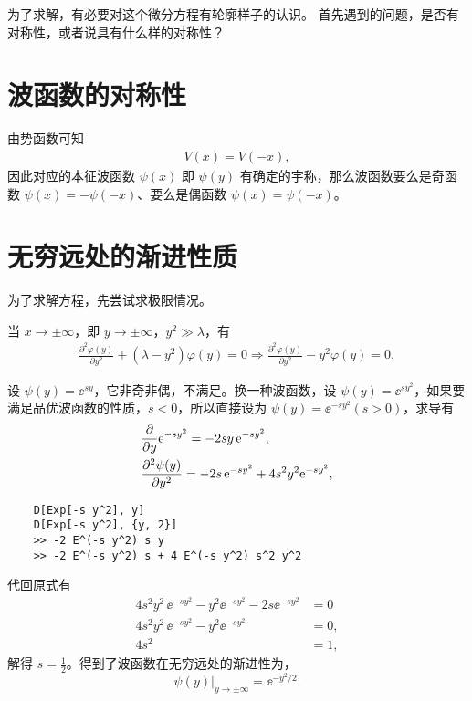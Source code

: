 为了求解，有必要对这个微分方程有轮廓样子的认识。
首先遇到的问题，是否有对称性，或者说具有什么样的对称性？
\section{波函数的对称性}
由势函数可知
\begin{align}
    V(x) = V(-x),
\end{align}
因此对应的本征波函数 $\psi(x)$ 即 $\psi(y)$ 有确定的宇称，那么波函数要么是奇函数 $\psi(x) = -\psi(-x)$、要么是偶函数 $\psi(x) = \psi(-x)$。

\section{无穷远处的渐进性质}
为了求解方程，先尝试求极限情况。

当 $x \rightarrow \pm \infty$，即 $y \rightarrow \pm \infty$，$y^2 \gg \lambda$，有
\begin{align}
    \frac{\partial^2 \varphi(y)}{\partial y^2}+\left(\lambda-y^2\right) \varphi(y)=0 \Rightarrow \frac{\partial^2 \varphi(y)}{\partial y^2}-y^2 \varphi(y)=0,
\end{align}

设 $\psi(y) = \ee^{sy}$，它非奇非偶，不满足。换一种波函数，设 $\psi(y) = \ee^{sy^2}$，如果要满足品优波函数的性质，$s<0$，所以直接设为 $\psi(y) = \ee^{-sy^2} (s>0)$，求导有
\begin{align}
    &\frac{\partial}{\partial y} \mathrm{e}^{-sy^2} = -2sy \, \mathrm{e}^{-sy^2}, \\
    &\pdv[2]{\psi(y)}{y} = -2 s\, \mathrm{e}^{-s y^2} + 4 s^2 y^2 \mathrm{e}^{-s y^2},
\end{align}
\begin{lstlisting}
    D[Exp[-s y^2], y]
    D[Exp[-s y^2], {y, 2}]
    >> -2 E^(-s y^2) s y
    >> -2 E^(-s y^2) s + 4 E^(-s y^2) s^2 y^2
    \end{lstlisting}
代回原式有
\begin{align}
    4s^2 y^2 \, \ee^{-sy^2} - y^2 \ee^{-sy^2} - 2 s \ee^{-sy^2} &= 0 \\
    4s^2 y^2 \, \ee^{-sy^2} - y^2 \ee^{-sy^2} &= 0, \\
    4 s^2 & = 1,
\end{align}
解得 $s = \frac12$。得到了波函数在无穷远处的渐进性为，
\begin{equation}
    \psi(y) |_{y \rightarrow \pm\infty} = \ee^{-y^2/2}.
\end{equation}
